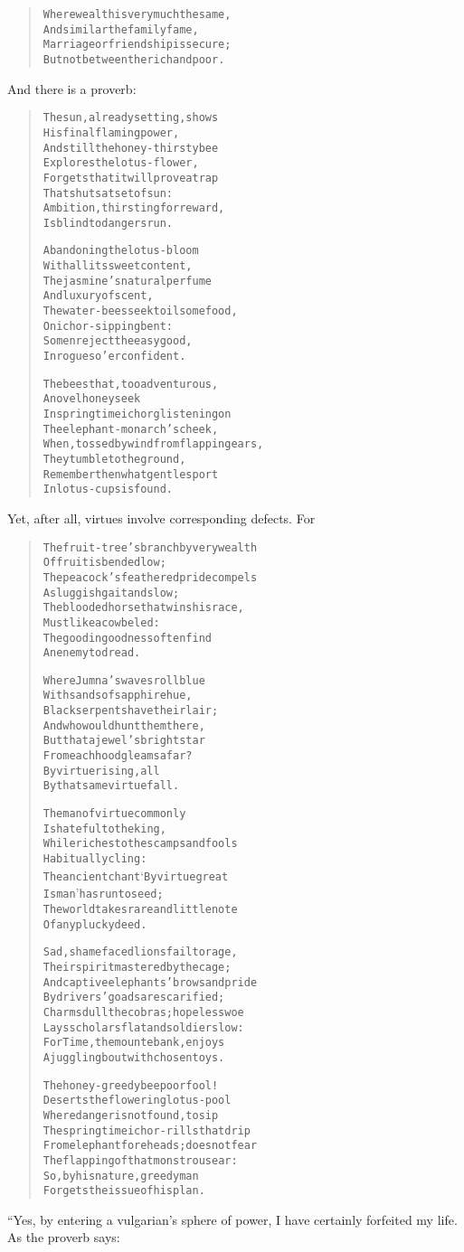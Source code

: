 \documentclass[article, twoside, 14pt]{memoir}
\renewenvironment{verbatim}{%
\begin{quote}%
\vskip -10pt%
\begin{alltt}\normalfont\large}{\end{alltt}%
\end{quote}%
\vskip -10pt
} %
\begin{document}
\begin{verbatim}
Where wealth is very much the same,
And similar the family fame,
Marriage or friendship is secure;
But not between the rich and poor.
\end{verbatim}
And there is a proverb:

\begin{verbatim}
The sun, already setting, shows
    His final flaming power,
And still the honey-thirsty bee
    Explores the lotus-flower,
Forgets that it will prove a trap
    That shuts at set of sun:
Ambition, thirsting for reward,
    Is blind to dangers run.

Abandoning the lotus-bloom
    With all its sweet content,
The jasmine's natural perfume
    And luxury of scent,
The water-bees seek toilsome food,
    On ichor-sipping bent:
So men reject the easy good,
    In rogues o'erconfident.

The bees that, too adventurous,
    A novel honey seek
In springtime ichor glistening on
    The elephant-monarch's cheek,
When, tossed by wind from flapping ears,
    They tumble to the ground,
Remember then what gentle sport
    In lotus-cups is found.
\end{verbatim}
Yet, after all, virtues involve corresponding defects. For

\begin{verbatim}
The fruit-tree's branch by very wealth
    Of fruit is bended low;
The peacock's feathered pride compels
    A sluggish gait and slow;
The blooded horse that wins his race,
    Must like a cow be led:
The good in goodness often find
    An enemy to dread.

Where Jumna's waves roll blue
With sands of sapphire hue,
Black serpents have their lair;
And who would hunt them there,
But that a jewel's bright star
From each hood gleams afar?
By virtue rising, all
By that same virtue fall.

The man of virtue commonly
    Is hateful to the king,
While riches to the scamps and fools
    Habitually cling:
The ancient chant ‘By virtue great
    Is man’ has run to seed;
The world takes rare and little note
    Of any plucky deed.

Sad, shamefaced lions fail to rage,
Their spirit mastered by the cage;
And captive elephants' brows and pride
By drivers' goads are scarified;
Charms dull the cobras; hopeless woe
Lays scholars flat and soldiers low:
For Time, the mountebank, enjoys
A juggling bout with chosen toys.

The honey-greedy bee{\textemdash}poor fool!{\textemdash}
Deserts the flowering lotus-pool
Where danger is not found, to sip
The springtime ichor-rills that drip
From elephant foreheads; does not fear
The flapping of that monstrous ear:
So, by his nature, greedy man
Forgets the issue of his plan.
\end{verbatim}
“Yes, by entering a vulgarian's sphere of power, I have certainly
forfeited my life. As the proverb says:
\end{document}
